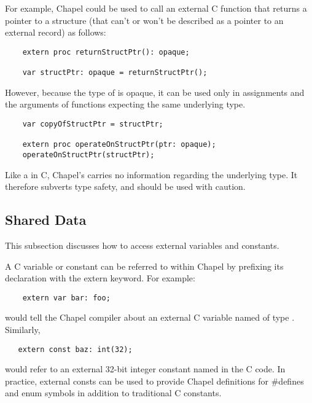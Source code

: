 For example, Chapel could be used to call an external C function that
returns a pointer to a structure (that can't or won't be described as
a pointer to an external record) as follows:
\begin{chapel}
\begin{verbatim}
    extern proc returnStructPtr(): opaque;

    var structPtr: opaque = returnStructPtr();
\end{verbatim}
\end{chapel}

However, because the type of  is opaque, it can be used only in
assignments and the arguments of functions expecting the same underlying type.
\begin{chapel}
\begin{verbatim}
    var copyOfStructPtr = structPtr;

    extern proc operateOnStructPtr(ptr: opaque);
    operateOnStructPtr(structPtr);
\end{verbatim}
\end{chapel}
\noindent
Like a  in C, Chapel's  carries no information
regarding the underlying type.  It therefore subverts type safety, and should be
used with caution.

\subsection{Shared Data}
\label{Shared_Data}

This subsection discusses how to access external variables and constants.

A C variable or constant can be referred to within Chapel by prefixing
its declaration with the extern keyword.  For example:
\begin{chapel}
\begin{verbatim}
    extern var bar: foo;
\end{verbatim}
\end{chapel}
\noindent
would tell the Chapel compiler about an external C variable named
 of type .  Similarly,
\begin{chapel}
\begin{verbatim}
   extern const baz: int(32);
\end{verbatim}
\end{chapel}
would refer to an external 32-bit integer constant named  in the
C code.  In practice, external consts can be used to provide Chapel
definitions for \#defines and enum symbols in addition to traditional C
constants.

